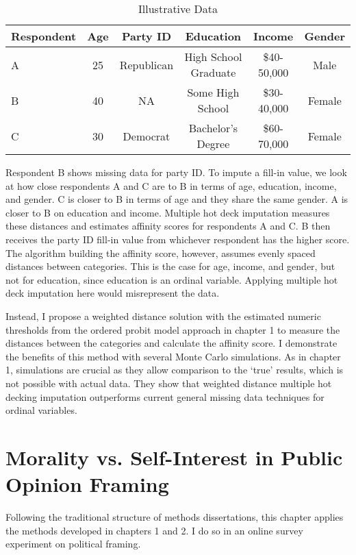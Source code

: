 \documentclass[11pt]{article}
\begin{document}
\begin{table}[H]
  \centering
  \singlespacing
  \begin{tabular}{lccccc}
  \bottomrule 
  \midrule
  Respondent & Age & Party ID & Education & Income & Gender\\
  \hline
  A & 25 & Republican & High School Graduate & \$40-50,000 & Male \\
  B & 40 & NA & Some High School &  \$30-40,000 & Female\\
  C & 30 & Democrat & Bachelor's Degree &  \$60-70,000 & Female\\
  \bottomrule 
  \end{tabular}
  \caption{Illustrative Data}
  \label{affscore}
\end{table}

Respondent B shows missing data for party ID. To impute a fill-in value, we look at how close respondents A and C are to B in terms of age, education, income, and gender. C is closer to B in terms of age and they share the same gender. A is closer to B on education and income. Multiple hot deck imputation measures these distances and estimates affinity scores for respondents A and C. B then receives the party ID fill-in value from whichever respondent has the higher score. The algorithm building the affinity score, however, assumes evenly spaced distances between categories. This is the case for age, income, and gender, but not for education, since education is an ordinal variable. Applying multiple hot deck imputation here would misrepresent the data.

Instead, I propose a weighted distance solution with the estimated numeric thresholds from the ordered probit model approach in chapter 1 to measure the distances between the categories and calculate the affinity score. I demonstrate the benefits of this method with several Monte Carlo simulations. As in chapter 1, simulations are crucial as they allow comparison to the `true' results, which is not possible with actual data. They show that weighted distance multiple hot decking imputation outperforms current general missing data techniques for ordinal variables.


\section{Morality vs. Self-Interest in Public Opinion Framing} 

Following the traditional structure of methods dissertations, this chapter applies the methods developed in chapters 1 and 2. I do so in an online survey experiment on political framing. 
\end{document}
